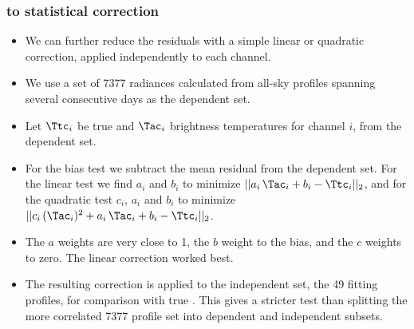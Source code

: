 \begin{frame}
\frametitle{{\airs} to {\cris} statistical correction}
\begin{itemize}

  \item We can further reduce the residuals with a simple linear or
    quadratic correction, applied independently to each channel.

  \item We use a set of 7377 radiances calculated from all-sky {\airs}
    profiles spanning several consecutive days as the dependent set.

  \item Let $\Ttc_i$ be true {\cris} and $\Tac_i$ {\airs} {\cris}
    brightness temperatures for {\cris} channel $i$, from the
    dependent set.

  \item For the bias test we subtract the mean residual from the
    dependent set.  For the linear test we find $a_i$ and $b_i$ to
    minimize $||a_i\,\Tac_i + b_i - \Ttc_i||_2$, and for the
    quadratic test $c_i$, $a_i$ and $b_i$ to minimize
    $||c_i\,(\Tac_i)^2 + a_i\,\Tac_i + b_i - \Ttc_i||_2$.

  \item The $a$ weights are very close to 1, the $b$ weight to the
    bias, and the $c$ weights to zero.  The linear correction worked
    best.

  \item The resulting correction is applied to the independent set,
    the 49 fitting profiles, for comparison with true {\cris}.  This
    gives a stricter test than splitting the more correlated 7377
    profile set into dependent and independent subsets.

\end{itemize}
\end{frame}
